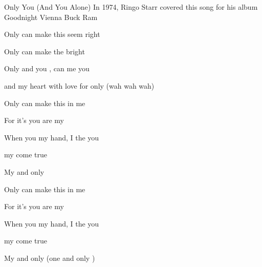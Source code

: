 \begin{SBSong}{Only You (And You Alone)}
  {In 1974, Ringo Starr covered this song for his album Goodnight Vienna}
  {Buck Ram}
  \begin{SBVerse}
    Only  can make this  seem right

    Only  can make the  bright 

    Only  and you , can  me  you 

    and  my heart with love for only  (wah wah wah)
  \end{SBVerse}
  \begin{SBVerse}
    Only  can make this  in me

    For it's  you are my  

    When you  my hand, I  the   you 

     my  come true

    My  and only 
  \end{SBVerse}
  \begin{SBVerse}
    Only  can make this  in me

    For it's  you are my  

    When you  my hand, I  the   you 

     my  come true

    My  and only  (one and only )
  \end{SBVerse}
\end{SBSong}